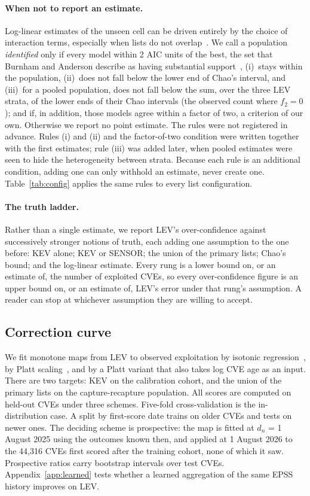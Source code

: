 \paragraph{When not to report an estimate.} Log-linear estimates of the unseen
cell can be driven entirely by the choice of interaction terms, especially when
lists do not overlap~\cite{chan2021sparse,binette2022mse}. We call a
population \emph{identified} only if every model within 2 AIC units of the best,
the set that Burnham and Anderson describe as having substantial
support~\cite{burnham2002}, (i)~stays within the population, (ii)~does not fall
below the lower end of Chao's interval, and (iii)~for a pooled population, does
not fall below the sum, over the three LEV strata, of the lower ends of their
Chao intervals (the observed count where $f_2 = 0$); and if, in addition, those
models agree within a factor of two, a criterion of our own. Otherwise we report no point estimate. The
rules were not registered in advance. Rules (i) and (ii) and the factor-of-two
condition were written together with the first estimates; rule (iii) was added
later, when pooled estimates were seen to hide the heterogeneity between
strata. Because each rule is an additional condition, adding one can only
withhold an estimate, never create one. Table~\ref{tab:config} applies the
same rules to every list configuration.

\paragraph{The truth ladder.} Rather than a single estimate, we report LEV's
over-confidence against successively stronger notions of truth, each adding one
assumption to the one before: KEV alone; KEV or SENSOR; the union of the
primary lists; Chao's bound; and the log-linear estimate. Every rung is a lower
bound on, or an estimate of, the number of exploited CVEs, so every
over-confidence figure is an upper bound on, or an estimate of, LEV's error
under that rung's assumption. A reader can stop at whichever assumption they are willing to
accept.

\subsection{Correction curve}\label{sec:m-correct}

We fit monotone maps from LEV to observed exploitation by isotonic
regression~\cite{zadrozny2002}, by Platt scaling~\cite{platt1999}, and by a
Platt variant that also takes log CVE age as an input. There are two targets:
KEV on the calibration cohort, and the union of the primary lists on the
capture-recapture population. All scores are computed on held-out CVEs under
three schemes. Five-fold cross-validation is the in-distribution case. A split
by first-score date trains on older CVEs and tests on newer ones. The deciding
scheme is prospective: the map is fitted at $d_n$ = 1 August 2025 using the
outcomes known then, and applied at 1 August 2026 to the 44,316 CVEs first
scored after the training cohort, none of which it saw. Prospective ratios carry
bootstrap intervals over test CVEs. Appendix~\ref{app:learned} tests whether a
learned aggregation of the same EPSS history improves on LEV.

